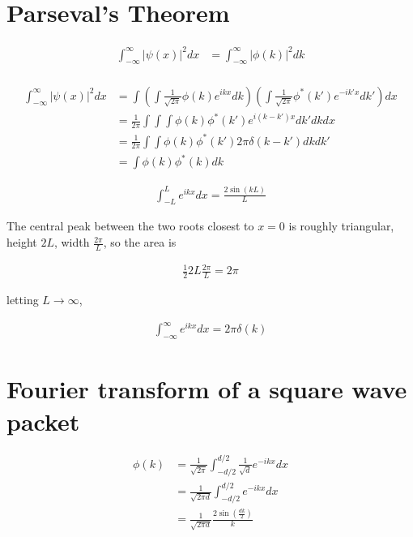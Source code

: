 \documentclass{article}
\title{}
\date{}
\newcommand{\<}{\langle}
\renewcommand{\>}{\rangle}
\begin{document}
\maketitle

\section{Parseval's Theorem}

\begin{align*}
\int_{-\infty}^{\infty} |\psi(x)|^2 dx &= \int_{-\infty}^{\infty} |\phi(k)|^2 dk \\
\end{align*}

\begin{align*}
\int_{-\infty}^{\infty} |\psi(x)|^2 dx &= \int \left(\int \frac{1}{\sqrt{2\pi}} \phi(k) e^{ikx} dk \right) \left( \int \frac{1}{\sqrt{2\pi}}\phi^*(k') e^{-ik'x} dk' \right) dx \\
&= \frac{1}{2\pi} \int\int\int \phi(k) \phi^*(k') e^{i(k-k')x} dk' dk dx \\
&= \frac{1}{2\pi} \int\int \phi(k) \phi^*(k') 2\pi\delta(k-k') dk dk' \\
&= \int \phi(k) \phi^*(k) dk
\end{align*}

\begin{align*}
\int_{-L}^L e^{ikx} dx = \frac{2\sin(kL)}{L}
\end{align*}

The central peak between the two roots closest to $x=0$ is roughly triangular, height $2L$, width $\frac{2\pi}{L}$, so the area is

\begin{align*}
\frac{1}{2} 2L \frac{2\pi}{L} = 2\pi
\end{align*}

letting $L \rightarrow \infty$,

\begin{align*}
\int_{-\infty}^\infty e^{ikx} dx = 2\pi\delta(k)
\end{align*}

\section{Fourier transform of a square wave packet}

\begin{align*}
\phi(k) &= \frac{1}{\sqrt{2\pi}} \int_{-d/2}^{d/2} \frac{1}{\sqrt d} e^{-ikx} dx \\
&= \frac{1}{\sqrt{2\pi d}} \int_{-d/2}^{d/2} e^{-ikx} dx \\
&= \frac{1}{\sqrt{2\pi d}} \frac{2\sin(\frac{dk}{2})}{k}
\end{align*}
\end{document}
